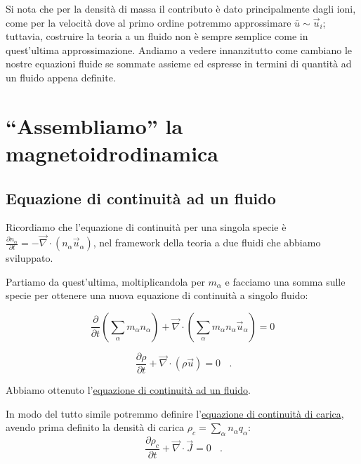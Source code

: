 Si nota che per la densità di massa il contributo è dato principalmente dagli ioni, come per la velocità dove al primo ordine potremmo approssimare $\bar u \sim \vec u_i$; tuttavia, costruire la teoria a un fluido non è sempre semplice come in quest'ultima approssimazione. Andiamo a vedere innanzitutto come cambiano le nostre equazioni fluide se sommate assieme ed espresse in termini di quantità ad un fluido appena definite.

\vspace{0.5cm}
\section{``Assembliamo'' la magnetoidrodinamica}

\subsection{Equazione di continuità ad un fluido}

Ricordiamo che l'equazione di continuità per una singola specie è $\frac{\partial n_\alpha}{\partial t} = -\vec \nabla\cdot (n_\alpha \vec u_\alpha)$, nel framework della teoria a due fluidi che abbiamo sviluppato. 

Partiamo da quest'ultima, moltiplicandola per $m_\alpha$ e facciamo una somma sulle specie per ottenere una nuova equazione di continuità a singolo fluido:

\[ \frac{\partial}{\partial t} \left(\sum_\alpha m_\alpha n_\alpha\right) + \vec \nabla \cdot \left(\sum_\alpha m_\alpha n_\alpha \vec u_\alpha \right) = 0 \]

\begin{equation}\label{continuità a un fluido}
	\boxed{\ \frac{\partial\rho}{\partial t} + \vec \nabla \cdot (\rho \vec u) = 0\ }\ \ \ .
\end{equation}

Abbiamo ottenuto l'\underline{equazione di continuità ad un fluido}.

\vspace{0.5cm}

In modo del tutto simile potremmo definire l'\underline{equazione di continuità di carica}, avendo prima definito la densità di carica $\rho_c=\sum_\alpha n_\alpha q_\alpha$:
\begin{equation}\label{continuità di carica a un fluido}
	\boxed{\ \frac{\partial\rho_c}{\partial t} + \vec \nabla \cdot \vec J = 0\ }\ \ \ .
\end{equation}


